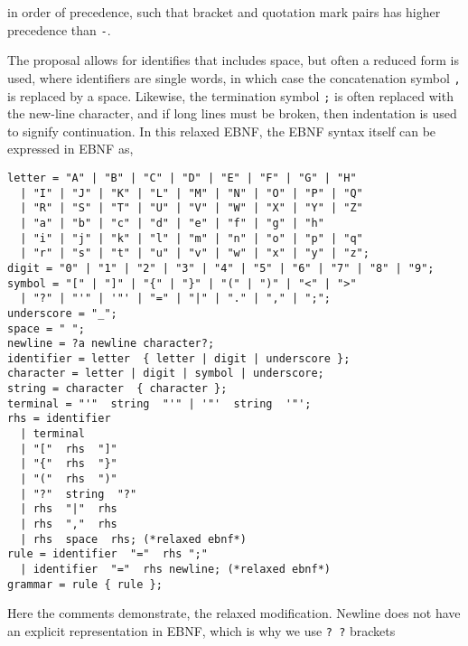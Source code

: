 in order of precedence, such that bracket and quotation mark pairs has higher precedence than \lstinline[language=ebnf]{-}. 

The proposal allows for identifies that includes space, but often a reduced form is used, where identifiers are single words, in which case the concatenation symbol \lstinline[language=ebnf]|,| is replaced by a space. Likewise, the termination symbol \lstinline[language=ebnf]|;| is often replaced with the new-line character, and if long lines must be broken, then indentation is used to signify continuation. In this relaxed EBNF, the EBNF syntax itself can be expressed in EBNF as,
\begin{lstlisting}[language=ebnf]
letter = "A" | "B" | "C" | "D" | "E" | "F" | "G" | "H" 
  | "I" | "J" | "K" | "L" | "M" | "N" | "O" | "P" | "Q" 
  | "R" | "S" | "T" | "U" | "V" | "W" | "X" | "Y" | "Z"
  | "a" | "b" | "c" | "d" | "e" | "f" | "g" | "h" 
  | "i" | "j" | "k" | "l" | "m" | "n" | "o" | "p" | "q" 
  | "r" | "s" | "t" | "u" | "v" | "w" | "x" | "y" | "z";
digit = "0" | "1" | "2" | "3" | "4" | "5" | "6" | "7" | "8" | "9";
symbol = "[" | "]" | "{" | "}" | "(" | ")" | "<" | ">"
  | "?" | "'" | '"' | "=" | "|" | "." | "," | ";";
underscore = "_";
space = " ";
newline = ?a newline character?;
identifier = letter  { letter | digit | underscore };
character = letter | digit | symbol | underscore; 
string = character  { character };
terminal = "'"  string  "'" | '"'  string  '"';
rhs = identifier
  | terminal
  | "["  rhs  "]"
  | "{"  rhs  "}"
  | "("  rhs  ")"
  | "?"  string  "?"
  | rhs  "|"  rhs
  | rhs  ","  rhs
  | rhs  space  rhs; (*relaxed ebnf*)
rule = identifier  "="  rhs ";"
  | identifier  "="  rhs newline; (*relaxed ebnf*)
grammar = rule { rule };
\end{lstlisting}
Here the comments demonstrate, the relaxed modification. Newline does not have an explicit representation in EBNF, which is why we use \lstinline[language=ebnf]{? ?} brackets

